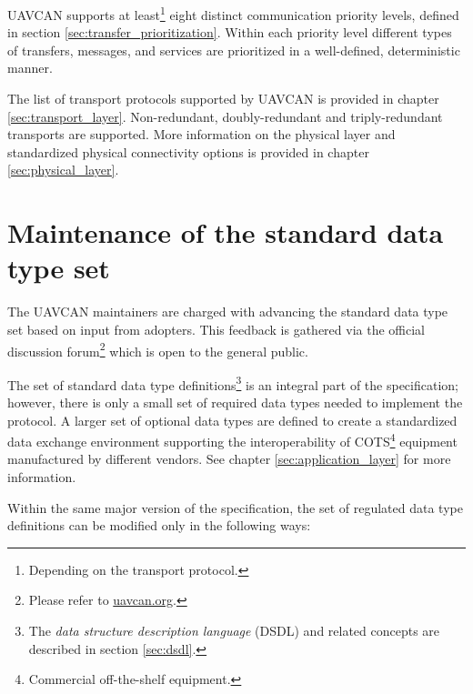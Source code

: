 UAVCAN supports at least\footnote{Depending on the transport protocol.} eight distinct communication priority levels,
defined in section \ref{sec:transfer_prioritization}.
Within each priority level different types of transfers, messages, and services are
prioritized in a well-defined, deterministic manner.

The list of transport protocols supported by UAVCAN is provided in chapter \ref{sec:transport_layer}.
Non-redundant, doubly-redundant and triply-redundant transports are supported.
More information on the physical layer and standardized physical connectivity options
is provided in chapter \ref{sec:physical_layer}.

\section{Maintenance of the standard data type set}

The UAVCAN maintainers are charged with advancing the standard data type set based on input from adopters.
This feedback is gathered via the official discussion
forum\footnote{Please refer to \href{http://uavcan.org}{uavcan.org}.}
which is open to the general public.

The set of standard data type definitions\footnote{The \emph{data structure description language} (DSDL) and
related concepts are described in section \ref{sec:dsdl}.} is an integral part of the specification;
however, there is only a small set of required data types needed to implement the protocol.
A larger set of optional data types are defined to create a standardized data exchange environment
supporting the interoperability of COTS\footnote{Commercial off-the-shelf equipment.}
equipment manufactured by different vendors.
See chapter \ref{sec:application_layer} for more information.

Within the same major version of the specification,
the set of regulated data type definitions can be modified only in the following ways:

